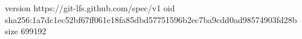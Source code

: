 version https://git-lfs.github.com/spec/v1
oid sha256:1a7dc1ec52bf67ff061e18fa85dbd57751596b2ec7ba9cdd0ad98574903fd28b
size 699192
